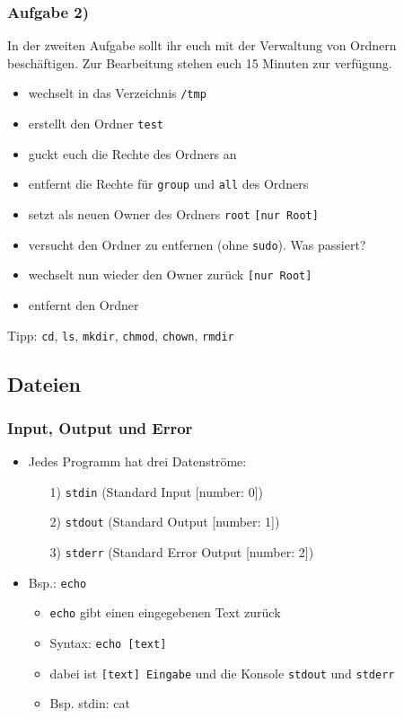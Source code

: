 \documentclass[12pt,utf8, handout]{beamer}
\begin{document}
\begin{frame}
\frametitle{Aufgabe 2)}
In der zweiten Aufgabe sollt ihr euch mit der Verwaltung von Ordnern beschäftigen. Zur Bearbeitung stehen euch 15 Minuten zur verfügung.
{\footnotesize
\begin{itemize}
	\item wechselt in das Verzeichnis \texttt{/tmp}
	\item erstellt den Ordner \texttt{test}
	\item guckt euch die Rechte des Ordners an
	\item entfernt die Rechte für \texttt{group} und \texttt{all} des Ordners
	\item setzt als neuen Owner des Ordners \texttt{root} \texttt{[nur Root]}
	\item versucht den Ordner zu entfernen (ohne \texttt{sudo}). Was passiert?
	\item wechselt nun wieder den Owner zurück \texttt{[nur Root]}
	\item entfernt den Ordner
\end{itemize}
}
{\scriptsize Tipp: \texttt{cd}, \texttt{ls}, \texttt{mkdir}, \texttt{chmod}, \texttt{chown}, \texttt{rmdir}}
\end{frame}

\subsection{Dateien}
\begin{frame}
\frametitle{Input, Output und Error}
\begin{itemize}
	\item Jedes Programm hat drei Datenströme:
	\begin{itemize}
		\item[1)] \texttt{stdin} (Standard Input [number: 0])
		\item[2)] \texttt{stdout} (Standard Output [number: 1])
		\item[3)] \texttt{stderr} (Standard Error Output [number: 2])
	\end{itemize}
	\item Bsp.: \texttt{echo}
	\begin{itemize}[<+->]
		\item \texttt{echo} gibt einen eingegebenen Text zurück
		\item Syntax: \texttt{echo [text]}
		\item dabei ist \texttt{[text] Eingabe} und die Konsole \texttt{stdout} und \texttt{stderr}
		\item Bsp. stdin: cat
	\end{itemize}
\end{itemize}
\end{frame}
\end{document}
